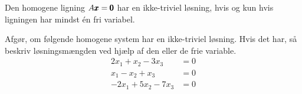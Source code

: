 \begin{remark}
    Den homogene ligning $A \pmb{x} = \pmb{0}$ har en ikke-triviel løsning, hvis og kun hvis ligningen har mindst én fri variabel.
\end{remark}

\begin{example}
    Afgør, om følgende homogene system har en ikke-triviel løsning. Hvis det har, så beskriv løsningsmængden ved hjælp af den eller de frie variable.
\[
\begin{aligned}
2 x_1+x_2-3 x_3 & =0 \\
x_1-x_2+x_3 & =0 \\
-2 x_1+5 x_2-7 x_3 & =0
\end{aligned}
\]

\end{example}

